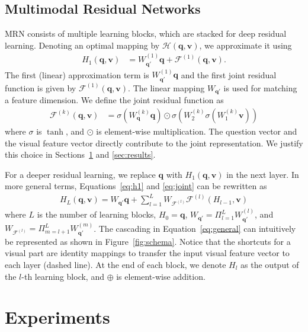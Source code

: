 \documentclass{article}
\newcommand{\vv}[0]{\mathbf{v}}
\newcommand{\vq}[0]{\mathbf{q}}
\begin{document}
\subsection{Multimodal Residual Networks}

MRN consists of multiple learning blocks, which are stacked for deep residual learning. Denoting an optimal mapping by $\mathcal{H}(\vq,\vv)$, we approximate it using \begin{align}
   \label{eq:h1}
   H_{1}(\vq,\vv) &= W_{\vq'}^{(1)} \vq + \mathcal{F}^{(1)}(\vq,\vv). 
\end{align}
The first (linear) approximation term is $W^{(1)}_{\vq'} \vq$ and the first joint residual function is given by $\mathcal{F}^{(1)}(\vq,\vv)$. The linear mapping $W_{\vq'}$ is used for matching a feature dimension. We define the joint residual function as \begin{align}
   \label{eq:joint}
   \mathcal{F}^{(k)}(\vq,\vv) &= \sigma(W_{\vq}^{(k)} \vq) \odot \sigma(W_{2}^{(k)} \sigma(W_{1}^{(k)} \vv))
\end{align}
where $\sigma$ is $\tanh$, and $\odot$ is element-wise multiplication. The question vector and the visual feature vector directly contribute to the joint representation. We justify this choice in Sections~\ref{sec:experiments} and \ref{sec:results}.

For a deeper residual learning, we replace $\vq$ with $H_{1}(\vq,\vv)$ in the next layer. In more general terms, Equations~\ref{eq:h1} and \ref{eq:joint} can be rewritten as \begin{align}
   \label{eq:general}
   H_{L}(\vq,\vv) = W_{\vq'} \vq + \sum_{l=1}^{L} W_{\mathcal{F}^{(l)}} \mathcal{F}^{(l)}(H_{l-1},\vv)
\end{align}
where $L$ is the number of learning blocks, $H_{0} = \vq$, $W_{\vq'} = \Pi_{l=1}^{L}W_{\vq'}^{(l)}$, and $W_{\mathcal{F}^{(l)}} = \Pi_{m=l+1}^{L}W_{\vq'}^{(m)}$. The cascading in Equation~\ref{eq:general} can intuitively be represented as shown in Figure~\ref{fig:schema}. Notice that the shortcuts for a visual part are identity mappings to transfer the input visual feature vector to each layer (dashed line). At the end of each block, we denote $H_{l}$ as the output of the $l$-th learning block, and $\oplus$ is element-wise addition.

\section{Experiments}
\label{sec:experiments}
\end{document}
